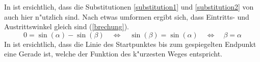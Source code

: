 In  ist ersichtlich, dass die Substitutionen \ref{substitution1} und \ref{substitution2} von  auch hier n"utzlich sind.
Nach etwas umformen ergibt sich, dass Eintritts- und Austrittswinkel gleich sind (\eqref{brechung}).
\begin{equation}
0 = \sin(\alpha) - \sin(\beta) \quad \Leftrightarrow \quad \sin(\beta) = \sin(\alpha) \quad \Leftrightarrow\quad \beta = \alpha
\label{brechung}
\end{equation}
In  ist ersichtlich, dass die Linie des Startpunktes bis zum 
gespiegelten Endpunkt eine Gerade ist, welche der Funktion des k"urzesten Weges entspricht.
